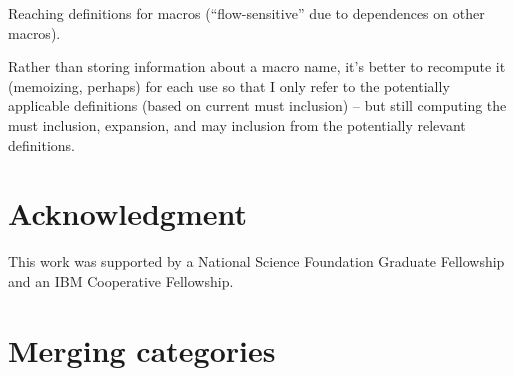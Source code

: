 \documentclass[10pt]{article}
\begin{document}
          
Reaching definitions for macros (``flow-sensitive'' due to
dependences on other macros).

Rather than storing information about a macro name, it's better to
recompute it (memoizing, perhaps) for each use so that I only refer to the
potentially applicable definitions (based on current must inclusion) -- but
still computing the must inclusion, expansion, and may inclusion from the
potentially relevant definitions.  


\section*{Acknowledgment}

This work was supported by a National Science Foundation Graduate
Fellowship and an IBM Cooperative Fellowship.
    


{\small }


\appendix

\section{Merging categories}
\label{app:category-lub}
\end{document}

